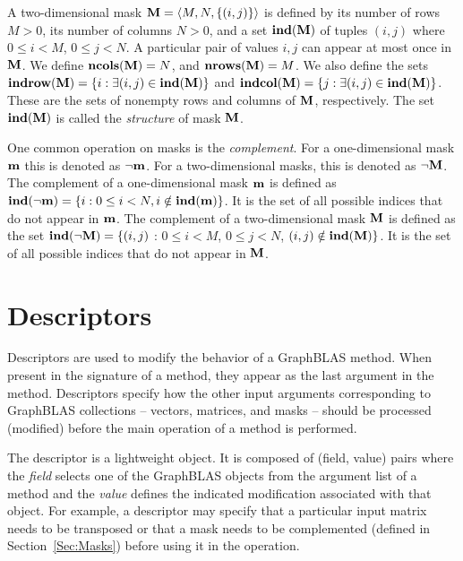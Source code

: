 A two-dimensional mask ${\bf M} = \langle M, N, \{ (i,j) \}
\rangle$ is defined by its number of rows $M>0$, its number of
columns $N>0$, and a set $\mathbf{ind}({\bf M})$ of tuples $(i,j)$
where $0 \leq i < M$, $0 \leq j < N$.   A particular pair of values
$i,j$ can appear at most once in ${\bf M}$.  We define
$\mathbf{ncols}({\bf M}) = N$, and $\mathbf{nrows}({\bf M}) = M$.
We also define the sets ${\bf indrow({\bf M})} = \{ i : \exists
(i,j) \in \mathbf{ind}({\bf M}) \}$ and ${\bf indcol({\bf M})}
= \{ j : \exists (i,j) \in \mathbf{ind}({\bf M}) \}$.  These are
the sets of nonempty rows and columns of ${\bf M}$, respectively.
The set $\mathbf{ind}({\bf M})$ is called the \emph{structure} of mask ${\bf M}$.

One common operation on masks is the \emph{complement}.
For a one-dimensional mask ${\bf m}$ this is denoted as
$\neg{\bf m}$. For a two-dimensional masks, this is denoted as
$\neg{\bf M}$.  The complement of a one-dimensional
mask ${\bf m}$ is defined as $\mathbf{ind}(\neg{\bf m}) = \{i : 0
\leq i < N, i \notin \mathbf{ind}({\bf m}) \}$.  It is the set of all
possible indices that do not appear in ${\bf m}$.  The 
complement of a two-dimensional mask ${\bf M}$ is defined as the set
$\mathbf{ind}(\neg{\bf M}) = \{(i,j)$ : $0 \leq i < M$, $0 \leq j < N$,
$(i,j) \notin \mathbf{ind}({\bf M}) \}$.  It is the set of all possible
indices that do not appear in ${\bf M}$.

\section{Descriptors}
\label{Sec:Descriptors}

Descriptors are used to modify the behavior of a GraphBLAS method.
When present in the signature of a method, they appear as the last
argument in the method.  Descriptors specify how the other input arguments
corresponding to GraphBLAS collections -- vectors, matrices, and masks
-- should be processed (modified) before the main operation of a method
is performed.

The descriptor is a lightweight object.  It is composed of (field,
value) pairs where the \emph{field} selects one of the GraphBLAS objects
from the argument list of a method and the \emph{value} defines the
indicated modification associated with that object.  For example,
a descriptor may specify that a particular input matrix needs to be
transposed or that a mask needs to be complemented (defined
in Section~\ref{Sec:Masks}) before using it in the operation.

